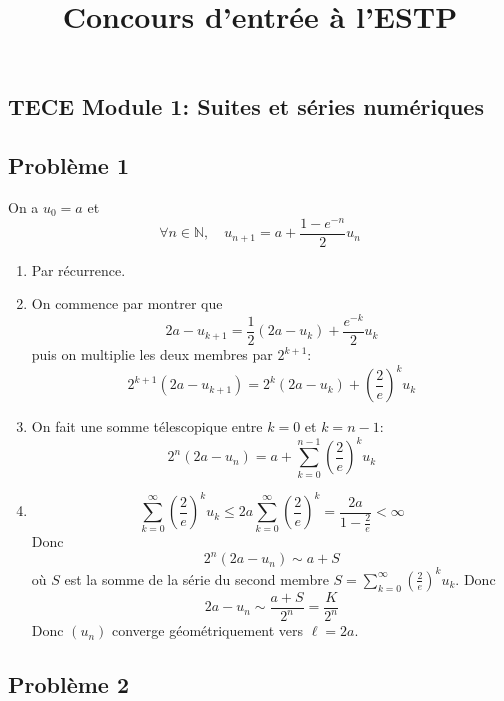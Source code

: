 \documentclass{article}
\title{Concours d'entrée à l'ESTP}
\date{}
\begin{document}
  \lstset{
    frame       = single,
    numbers     = left,
    showspaces  = false,
    showstringspaces    = false,
    captionpos  = t,
    caption     = \lstname
}
\begin{center}
\section*{TECE Module 1: Suites et séries numériques}
\end{center}
\subsection*{Problème 1}
On a $u_0=a$ et
\[\forall n\in \mathbb{N},\quad u_{n+1}=a+\frac{1-e^{-n}}{2}u_n\]
\begin{enumerate}
\item Par récurrence.
\item On commence par montrer que
 \[2a-u_{k+1}=\frac 12 (2a-u_k)+\frac{e^{-k}}2 u_k\]
 puis on multiplie les deux membres par $2^{k+1}$:
\[2^{k+1}(2a-u_{k+1})=2^k(2a-u_k)+\left(\frac{2}{e}\right)^ku_k\]
\item On fait une somme télescopique entre $k=0$ et $k=n-1$:
\[2^n(2a-u_n)=a+\sum_{k=0}^{n-1}\left(\frac{2}{e}\right)^ku_k\]
\item  \[\sum_{k=0}^\infty\left(\frac{2}{e}\right)^ku_k\leq 2a \sum_{k=0}^\infty\left(\frac{2}{e}\right)^k =\frac{2a}{1-\frac 2e}<\infty\] 
Donc \[2^n(2a-u_n)\sim a+S\] où $S$ est la somme de la série du second membre $S=\sum_{k=0}^\infty\left(\frac{2}{e}\right)^ku_k$.
 Donc \[2a-u_n\sim\frac{a+S}{2^n}= \frac{K}{2^n}\] 
 Donc $(u_n)$ converge géométriquement vers $\ell=2a$.
\end{enumerate}

\subsection*{Problème 2}
\end{document}
